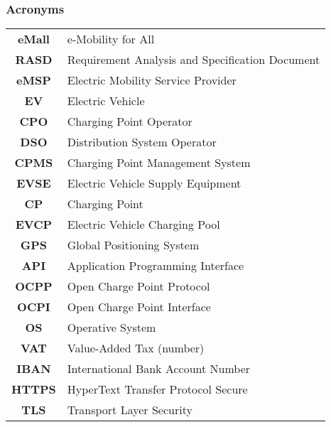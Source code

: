 \subsubsection{Acronyms}
\begin{table}[H]
    \begin{tabularx}{\textwidth}{cX}
        \toprule
        \textbf{eMall} & e-Mobility for All                              \\
        \textbf{RASD}  & Requirement Analysis and Specification Document \\
        \textbf{eMSP}  & Electric Mobility Service Provider              \\
        \textbf{EV}    & Electric Vehicle                                \\
        \textbf{CPO}   & Charging Point Operator                         \\
        \textbf{DSO}   & Distribution System Operator                    \\
        \textbf{CPMS}  & Charging Point Management System                \\
        \textbf{EVSE}  & Electric Vehicle Supply Equipment               \\
        \textbf{CP}    & Charging Point                                  \\
        \textbf{EVCP}  & Electric Vehicle Charging Pool                  \\
        \textbf{GPS}   & Global Positioning System                       \\
        \textbf{API}   & Application Programming Interface               \\
        \textbf{OCPP}  & Open Charge Point Protocol                      \\
        \textbf{OCPI}  & Open Charge Point Interface                     \\
        \textbf{OS}    & Operative System                                \\
        \textbf{VAT}   & Value-Added Tax (number)                        \\
        \textbf{IBAN}  & International Bank Account Number               \\
        \textbf{HTTPS} & HyperText Transfer Protocol Secure              \\
        \textbf{TLS}   & Transport Layer Security                        \\
        \bottomrule
    \end{tabularx}
\end{table}
\vspace*{1cm}
